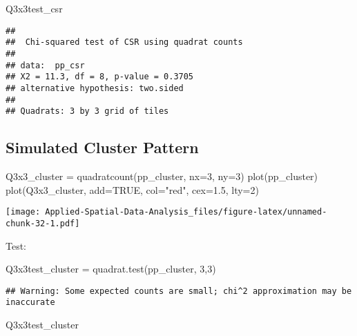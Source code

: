 \documentclass[
]{book}
\newenvironment{Shaded}{\begin{snugshade}}{\end{snugshade}}
\newcommand{\AttributeTok}[1]{\textcolor[rgb]{0.77,0.63,0.00}{#1}}
\newcommand{\ConstantTok}[1]{\textcolor[rgb]{0.00,0.00,0.00}{#1}}
\newcommand{\DecValTok}[1]{\textcolor[rgb]{0.00,0.00,0.81}{#1}}
\newcommand{\FloatTok}[1]{\textcolor[rgb]{0.00,0.00,0.81}{#1}}
\newcommand{\FunctionTok}[1]{\textcolor[rgb]{0.00,0.00,0.00}{#1}}
\newcommand{\NormalTok}[1]{#1}
\newcommand{\OtherTok}[1]{\textcolor[rgb]{0.56,0.35,0.01}{#1}}
\newcommand{\StringTok}[1]{\textcolor[rgb]{0.31,0.60,0.02}{#1}}
\begin{document}
\begin{Shaded}
\begin{Highlighting}[]
\NormalTok{Q3x3test\_csr}
\end{Highlighting}
\end{Shaded}

\begin{verbatim}
## 
##  Chi-squared test of CSR using quadrat counts
## 
## data:  pp_csr
## X2 = 11.3, df = 8, p-value = 0.3705
## alternative hypothesis: two.sided
## 
## Quadrats: 3 by 3 grid of tiles
\end{verbatim}

\hypertarget{simulated-cluster-pattern}{%
\subsection{Simulated Cluster Pattern}\label{simulated-cluster-pattern}}

\begin{Shaded}
\begin{Highlighting}[]
\NormalTok{Q3x3\_cluster }\OtherTok{=} \FunctionTok{quadratcount}\NormalTok{(pp\_cluster, }\AttributeTok{nx=}\DecValTok{3}\NormalTok{, }\AttributeTok{ny=}\DecValTok{3}\NormalTok{)}
\FunctionTok{plot}\NormalTok{(pp\_cluster)}
\FunctionTok{plot}\NormalTok{(Q3x3\_cluster, }\AttributeTok{add=}\ConstantTok{TRUE}\NormalTok{, }\AttributeTok{col=}\StringTok{"red"}\NormalTok{, }\AttributeTok{cex=}\FloatTok{1.5}\NormalTok{, }\AttributeTok{lty=}\DecValTok{2}\NormalTok{)}
\end{Highlighting}
\end{Shaded}

\texttt{[image: Applied-Spatial-Data-Analysis\_files/figure-latex/unnamed-chunk-32-1.pdf]}

Test:

\begin{Shaded}
\begin{Highlighting}[]
\NormalTok{Q3x3test\_cluster }\OtherTok{=} \FunctionTok{quadrat.test}\NormalTok{(pp\_cluster, }\DecValTok{3}\NormalTok{,}\DecValTok{3}\NormalTok{)}
\end{Highlighting}
\end{Shaded}

\begin{verbatim}
## Warning: Some expected counts are small; chi^2 approximation may be inaccurate
\end{verbatim}

\begin{Shaded}
\begin{Highlighting}[]
\NormalTok{Q3x3test\_cluster}
\end{Highlighting}
\end{Shaded}
\end{document}
